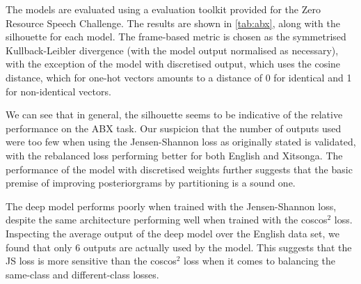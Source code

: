 The models are evaluated using a evaluation toolkit provided for the Zero Resource Speech Challenge.
The results are shown in \cref{tab:abx}, along with the silhouette for each model.
The frame-based metric is chosen as the symmetrised Kullback-Leibler divergence (with the model output normalised as necessary), with the exception of the model with discretised output, which uses the cosine distance, which for one-hot vectors amounts to a distance of 0 for identical and 1 for non-identical vectors.

We can see that in general, the silhouette seems to be indicative of the relative performance on the ABX task.
Our suspicion that the number of outputs used were too few when using the Jensen-Shannon loss as originally stated is validated, with the rebalanced loss performing better for both English and Xitsonga.
The performance of the model with discretised weights further suggests that the basic premise of improving posteriorgrams by partitioning is a sound one.

The deep model performs poorly when trained with the Jensen-Shannon loss, despite the same architecture performing well when trained with the coscos$^2$ loss.
Inspecting the average output of the deep model over the English data set, we found that only 6 outputs are actually used by the model.
This suggests that the JS loss is more sensitive than the coscos$^2$ loss when it comes to balancing the same-class and different-class losses.


